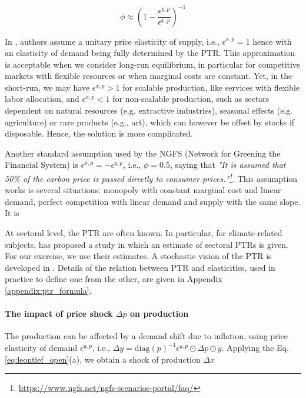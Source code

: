 \documentclass{article}
\begin{document}
\begin{equation}
\label{eq:ptr_perfect_competition}
    \phi \approx \left( 1 - \frac{\epsilon^{y,p}}{\epsilon^{x,p}} \right)^{-1}
\end{equation}

\noindent In \cite{desnos2023climate,roncalli2024economic}, authors assume a unitary price elasticity of supply, i.e., $\epsilon^{x,p}=1$ hence with an elasticity of demand being fully determined by the PTR. This approximation is acceptable when we consider long-run equilibrium, in particular for competitive markets with flexible resources or when marginal costs are constant. Yet, in the short-run, we may have $\epsilon^{x,p} > 1$ for scalable production, like services with flexible labor allocation, and $\epsilon^{x,p} < 1$ for non-scalable production, such as sectors dependent on natural resources (e.g. extractive industries), seasonal effects (e.g. agriculture) or rare products (e.g., art), which can however be offset by stocks if disposable. Hence, the solution is more complicated. 

\vspace{0.1cm}

Another standard assumption used by the NGFS (Network for Greening the Financial System) is $\epsilon^{x,p}=-\epsilon^{y,p}$, i.e., $\phi=0.5$, saying that \textit{"It is assumed that 50\% of the carbon price is passed directly to consumer prices."\footnote{\url{https://www.ngfs.net/ngfs-scenarios-portal/faq/}}}. This assumption works is several situations: monopoly with constant marginal cost and linear demand, perfect competition with linear demand and supply with the same slope. It is 

\vspace{0.1cm}

At sectoral level, the PTR are often known. In particular, for climate-related subjects, \cite{sautel2022tarification} has proposed a study in which an estimate of sectoral PTRs is given. For our exercise, we use their estimates. A stochastic vision of the PTR is developed in \cite{desnos2023climate}. Details of the relation between PTR and elasticities, used in practice to define one from the other, are given in Appendix \ref{appendix:ptr_formula}. 

\paragraph{The impact of price shock $\Delta p$ on production} The production can be affected by a demand shift due to inflation, using price elasticity of demand $\epsilon^{y,p}$, i.e., $\Delta y = \text{diag}(p)^{-1} \epsilon^{y,p} \odot \Delta p \odot y$. Applying the Eq. \eqref{eq:leontief_open}(a), we obtain a shock of production $\Delta x$
\end{document}
